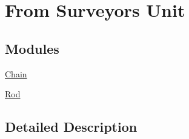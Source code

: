 \hypertarget{group___e_g_x_math-_conversions-_length_conversions-_surveyors}{}\section{From Surveyors Unit}
\label{group___e_g_x_math-_conversions-_length_conversions-_surveyors}
\subsection*{Modules}
\begin{DoxyCompactItemize}
\item 
\mbox{\hyperlink{group___e_g_x_math-_conversions-_length_conversions-_surveyors-_chain}{Chain}}
\item 
\mbox{\hyperlink{group___e_g_x_math-_conversions-_length_conversions-_surveyors-_rod}{Rod}}
\end{DoxyCompactItemize}


\subsection{Detailed Description}
